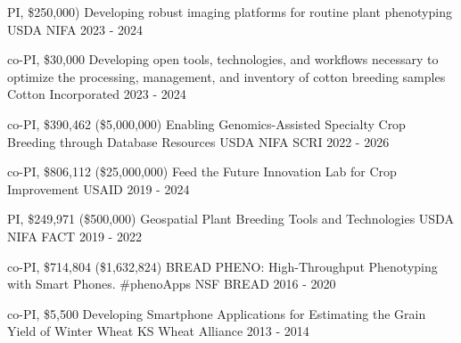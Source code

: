 \begin{cvgrants}

  \cvgrant
    {PI, \$250,000)}
    {Developing robust imaging platforms for routine plant phenotyping}
    {USDA NIFA} %
    {2023 - 2024}
    {
    }

  \cvgrant
    {co-PI, \$30,000}
    {Developing open tools, technologies, and workflows necessary to optimize the processing, management, and inventory of cotton breeding samples}
    {Cotton Incorporated} %
    {2023 - 2024}
    {
    }

  \cvgrant
    {co-PI, \$390,462 (\$5,000,000)}
    {Enabling Genomics-Assisted Specialty Crop Breeding through Database Resources}
    {USDA NIFA SCRI} %
    {2022 - 2026}
    {
    }

  \cvgrant
    {co-PI, \$806,112 (\$25,000,000)}
    {Feed the Future Innovation Lab for Crop Improvement}
    {USAID} %
    {2019 - 2024}
    {
    }

  \cvgrant
    {PI, \$249,971 (\$500,000)} %
    {Geospatial Plant Breeding Tools and Technologies}
    {USDA NIFA FACT} %
    {2019 - 2022}
    {
    }

  \cvgrant
    {co-PI, \$714,804 (\$1,632,824)} %
    {BREAD PHENO: High-Throughput Phenotyping with Smart Phones. \#phenoApps}
    {NSF BREAD} %
    {2016 - 2020}
    {
    }

  \cvgrant
    {co-PI, \$5,500} %
    {Developing Smartphone Applications for Estimating the Grain Yield of Winter Wheat}
    {KS Wheat Alliance}
    {2013 - 2014}
    {
    }

\end{cvgrants}
